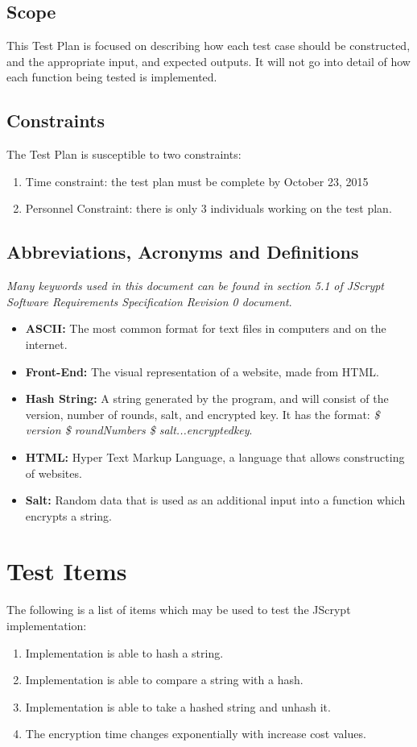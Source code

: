 \documentclass[12pt]{article}
\begin{document}
\subsection{Scope}
This Test Plan is focused on describing how each test case should be constructed, and the appropriate input, and expected outputs. It will not go into detail of how each function being tested is implemented.

\subsection{Constraints}
The Test Plan is susceptible to two constraints:
\begin{enumerate}
  \item Time constraint: the test plan must be complete by October 23, 2015
  \item Personnel Constraint: there is only 3 individuals working on the test plan.

\end{enumerate}


\subsection{Abbreviations, Acronyms and Definitions}
\textit{ Many keywords used in this document can be found in section 5.1 of JScrypt Software Requirements Specification Revision 0 document}.

\begin{itemize}
 \item \textbf{ASCII:} The most common format for text files in computers and on the internet.
 \item \textbf{Front-End:} The visual representation of a website, made from HTML.
 \item \textbf{Hash String:} A string generated by the program, and will consist of the version, number of rounds, salt, and encrypted key. It has the format:\textit{ \$ version \$ roundNumbers \$ salt...encryptedkey}.

 \item \textbf{HTML:} Hyper Text Markup Language, a language that allows constructing of websites.
 \item \textbf{Salt:} Random data that is used as an additional input into a function which encrypts a string.

\end{itemize}
\section{Test Items}
The following is a list of items which may be used to test the JScrypt implementation:
\begin{enumerate}
  \item Implementation is able to hash a string.
  \item Implementation is able to compare a string with a hash.
  \item Implementation is able to take a hashed string and unhash it.
  \item The encryption time changes exponentially with increase cost values.
 \end{enumerate}
\end{document}
